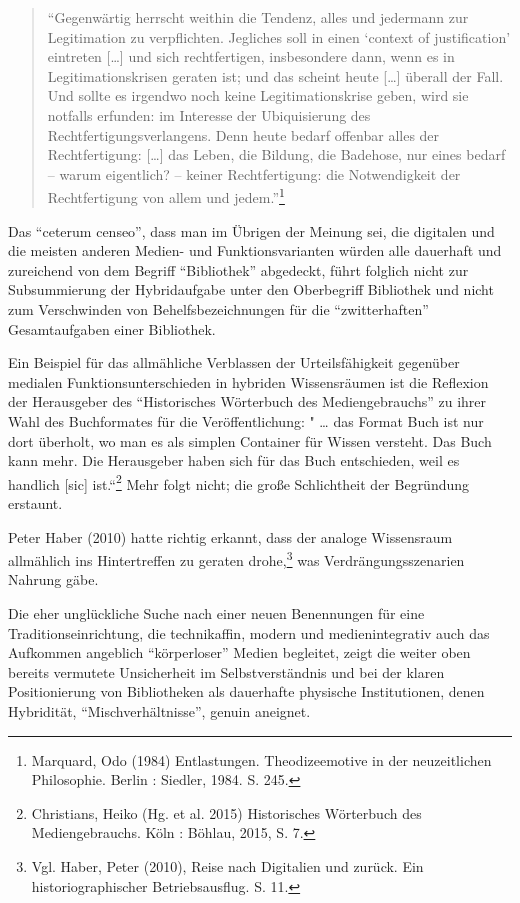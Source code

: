 \documentclass[a4paper,
fontsize=11pt,
oneside,
numbers=noperiodatend,
parskip=half-,
bibliography=totoc,
final
]{scrartcl}
\begin{document}
\begin{quote}
\enquote{Gegenwärtig herrscht weithin die Tendenz, alles und jedermann
zur Legitimation zu verpflichten. Jegliches soll in einen
\enquote{context of justification} eintreten {[}\ldots{}{]} und sich
rechtfertigen, insbesondere dann, wenn es in Legitimationskrisen geraten
ist; und das scheint heute {[}\ldots{}{]} überall der Fall. Und sollte
es irgendwo noch keine Legitimationskrise geben, wird sie notfalls
erfunden: im Interesse der Ubiquisierung des Rechtfertigungsverlangens.
Denn heute bedarf offenbar alles der Rechtfertigung: {[}\ldots{}{]} das
Leben, die Bildung, die Badehose, nur eines bedarf -- warum eigentlich?
-- keiner Rechtfertigung: die Notwendigkeit der Rechtfertigung von allem
und jedem.}\footnote{Marquard, Odo (1984) Entlastungen. Theodizeemotive
  in der neuzeitlichen Philosophie. Berlin : Siedler, 1984. S. 245.}
\end{quote}

Das \enquote{ceterum censeo}, dass man im Übrigen der Meinung sei, die
digitalen und die meisten anderen Medien- und Funktionsvarianten würden
alle dauerhaft und zureichend von dem Begriff \enquote{Bibliothek}
abgedeckt, führt folglich nicht zur Subsummierung der Hybridaufgabe
unter den Oberbegriff Bibliothek und nicht zum Verschwinden von
Behelfsbezeichnungen für die \enquote{zwitterhaften} Gesamtaufgaben
einer Bibliothek.

Ein Beispiel für das allmähliche Verblassen der Urteilsfähigkeit
gegenüber medialen Funktionsunterschieden in hybriden Wissensräumen ist
die Reflexion der Herausgeber des \enquote{Historisches Wörterbuch des
Mediengebrauchs} zu ihrer Wahl des Buchformates für die
Veröffentlichung: " \ldots{} das Format Buch ist nur dort überholt, wo
man es als simplen Container für Wissen versteht. Das Buch kann mehr.
Die Herausgeber haben sich für das Buch entschieden, weil es handlich
{[}sic{]} ist.``\footnote{Christians, Heiko (Hg. et al. 2015)
  Historisches Wörterbuch des Mediengebrauchs. Köln : Böhlau, 2015, S.
  7.} Mehr folgt nicht; die große Schlichtheit der Begründung erstaunt.

Peter Haber (2010) hatte richtig erkannt, dass der analoge Wissensraum
allmählich ins Hintertreffen zu geraten drohe,\footnote{Vgl. Haber,
  Peter (2010), Reise nach Digitalien und zurück. Ein
  historiographischer Betriebsausflug. S. 11.} was Verdrängungsszenarien
Nahrung gäbe.

Die eher unglückliche Suche nach einer neuen Benennungen für eine
Traditionseinrichtung, die technikaffin, modern und medienintegrativ
auch das Aufkommen angeblich \enquote{körperloser} Medien begleitet,
zeigt die weiter oben bereits vermutete Unsicherheit im
Selbstverständnis und bei der klaren Positionierung von Bibliotheken als
dauerhafte physische Institutionen, denen Hybridität,
\enquote{Mischverhältnisse}, genuin aneignet.
\end{document}
